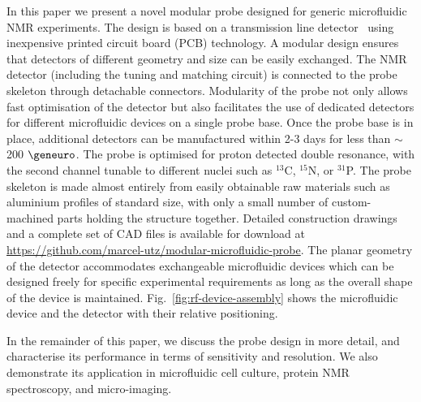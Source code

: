 \documentclass[preprint,5p]{elsarticle}
\newcommand{\fig}[1]{Fig.~\ref{#1}}
\begin{document}
In this paper we present a novel modular probe designed for generic
microfluidic NMR experiments. The design is based on a transmission line
detector~\cite{stripline_jan,gream_2016} using inexpensive
printed circuit board (PCB) technology. A modular design ensures that detectors of
different geometry and size can be easily exchanged.
The NMR detector (including the tuning and matching circuit) is connected to the probe
skeleton through detachable connectors. Modularity of the probe not only allows
fast optimisation of the detector but also facilitates the use of dedicated detectors
for different microfluidic devices on a single probe base.
Once the probe base is in place, additional detectors can be manufactured
within 2-3 days for less than $\sim$200 $\geneuro$.
The probe is optimised for proton detected double resonance, with the
second channel tunable to different nuclei such as $^{13}$C, $^{15}$N, or
$^{31}$P. The probe skeleton is made almost entirely from easily obtainable raw materials
such as aluminium profiles of standard size, with only a small number of
custom-machined parts holding the structure together.
Detailed construction drawings and a complete set of CAD files is
available for download at \url{https://github.com/marcel-utz/modular-microfluidic-probe}.
The planar geometry of the detector accommodates exchangeable microfluidic devices
which can be designed freely for specific experimental requirements as long as the
overall shape of the device is maintained. \fig{fig:rf-device-assembly} shows the microfluidic device and the detector with their relative positioning.

In the remainder of this paper, we discuss the probe design in more detail,
and characterise its performance in terms of sensitivity and resolution.
We also demonstrate its application in microfluidic cell culture,
protein NMR spectroscopy, and micro-imaging.
\end{document}
